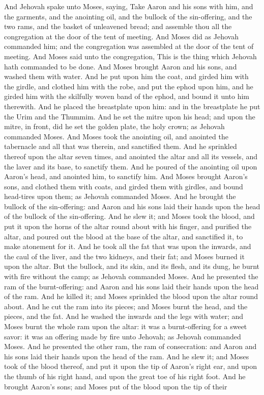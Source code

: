 And Jehovah spake unto Moses, saying, Take Aaron and his sons with him, and the garments, and the anointing oil, and the bullock of the sin-offering, and the two rams, and the basket of unleavened bread; and assemble thou all the congregation at the door of the tent of meeting. And Moses did as Jehovah commanded him; and the congregation was assembled at the door of the tent of meeting. And Moses said unto the congregation, This is the thing which Jehovah hath commanded to be done.  And Moses brought Aaron and his sons, and washed them with water. And he put upon him the coat, and girded him with the girdle, and clothed him with the robe, and put the ephod upon him, and he girded him with the skilfully woven band of the ephod, and bound it unto him therewith. And he placed the breastplate upon him: and in the breastplate he put the Urim and the Thummim. And he set the mitre upon his head; and upon the mitre, in front, did he set the golden plate, the holy crown; as Jehovah commanded Moses.  And Moses took the anointing oil, and anointed the tabernacle and all that was therein, and sanctified them. And he sprinkled thereof upon the altar seven times, and anointed the altar and all its vessels, and the laver and its base, to sanctify them. And he poured of the anointing oil upon Aaron’s head, and anointed him, to sanctify him. And Moses brought Aaron’s sons, and clothed them with coats, and girded them with girdles, and bound head-tires upon them; as Jehovah commanded Moses.  And he brought the bullock of the sin-offering: and Aaron and his sons laid their hands upon the head of the bullock of the sin-offering. And he slew it; and Moses took the blood, and put it upon the horns of the altar round about with his finger, and purified the altar, and poured out the blood at the base of the altar, and sanctified it, to make atonement for it. And he took all the fat that was upon the inwards, and the caul of the liver, and the two kidneys, and their fat; and Moses burned it upon the altar. But the bullock, and its skin, and its flesh, and its dung, he burnt with fire without the camp; as Jehovah commanded Moses.  And he presented the ram of the burnt-offering: and Aaron and his sons laid their hands upon the head of the ram. And he killed it; and Moses sprinkled the blood upon the altar round about. And he cut the ram into its pieces; and Moses burnt the head, and the pieces, and the fat. And he washed the inwards and the legs with water; and Moses burnt the whole ram upon the altar: it was a burnt-offering for a sweet savor: it was an offering made by fire unto Jehovah; as Jehovah commanded Moses.  And he presented the other ram, the ram of consecration: and Aaron and his sons laid their hands upon the head of the ram. And he slew it; and Moses took of the blood thereof, and put it upon the tip of Aaron’s right ear, and upon the thumb of his right hand, and upon the great toe of his right foot. And he brought Aaron’s sons; and Moses put of the blood upon the tip of their 